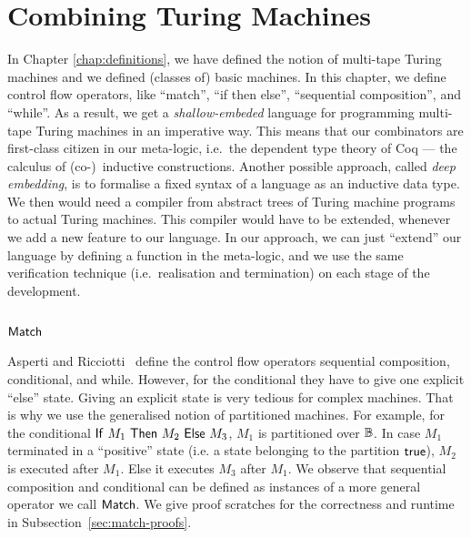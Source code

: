 \chapter{Combining Turing Machines}
\label{chap:combining}

In Chapter \ref{chap:definitions}, we have defined the notion of multi-tape Turing machines and we defined (classes of) basic machines.  In this
chapter, we define control flow operators, like ``match'', ``if then else'', ``sequential composition'', and ``while''.  As a result, we get a
\textit{shallow-embeded} language for programming multi-tape Turing machines in an imperative way.  This means that our combinators are first-class
citizen in our meta-logic, i.e.\ the dependent type theory of Coq --- the calculus of (co-)~inductive constructions.  Another possible approach, called
\textit{deep embedding}, is to formalise a fixed syntax of a language as an inductive data type.  We then would need a compiler from abstract trees of
Turing machine programs to actual Turing machines.  This compiler would have to be extended, whenever we add a new feature to our language.  In our
approach, we can just ``extend'' our language by defining a function in the meta-logic, and we use the same verification technique (i.e.\ realisation
and termination) on each stage of the development.


\section{$\mathsf{Match}$}
\label{sec:match}

Asperti and Ricciotti~\cite{asperti2015} define the control flow operators sequential composition, conditional, and while.  However, for the
conditional they have to give one explicit ``else'' state.  Giving an explicit state is very tedious for complex machines.  That is why we use the
generalised notion of partitioned machines.  For example, for the conditional $\mathsf{If}~M_1~\mathsf{Then}~M_2~\mathsf{Else}~M_3$, $M_1$ is partitioned over $\mathbb{B}$.  In case $M_1$
terminated in a ``positive'' state (i.e. a state belonging to the partition $\mathsf{true}$), $M_2$ is executed after $M_1$.  Else it executes $M_3$ after
$M_1$.  We observe that sequential composition and conditional can be defined as instances of a more general operator we call $\mathsf{Match}$.  We give
proof scratches for the correctness and runtime in Subsection~\ref{sec:match-proofs}.

